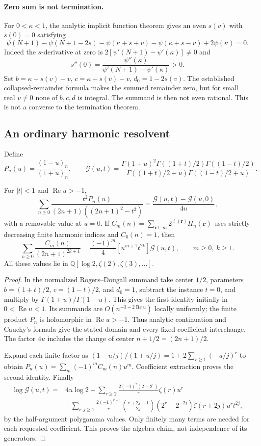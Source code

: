 \paragraph{Zero sum is not termination.}
For $0<\kappa<1$, the analytic implicit function theorem gives an even
$s(v)$ with $s(0)=0$ satisfying
\[
 \psi(N+1)-\psi(N+1-2s)-\psi(\kappa+s+v)
        -\psi(\kappa+s-v)+2\psi(\kappa)=0.
\]
Indeed the $s$-derivative at zero is
$2[\psi'(N+1)-\psi'(\kappa)]\ne0$ and
\[
 s''(0)=\frac{\psi''(\kappa)}{\psi'(N+1)-\psi'(\kappa)}>0.
\]
Set $b=\kappa+s(v)+v$, $c=\kappa+s(v)-v$, $d_0=1-2s(v)$.
The established collapsed-remainder formula makes the summed remainder
zero, but for small real $v\ne0$ none of $b,c,d$ is integral.
The summand is then not even rational. This is not a converse to the
termination theorem.

\subsection{An ordinary harmonic resolvent}
Define
\[
 P_n(u)=\frac{(1-u)_n}{(1+u)_n},\qquad
 \mathcal G(u,t)=\frac{\Gamma(1+u)^2\Gamma((1+t)/2)\Gamma((1-t)/2)}
 {\Gamma((1+t)/2+u)\Gamma((1-t)/2+u)}.
\]
\begin{theorem}
\label{dterm:thm:generator}
For $|t|<1$ and $\operatorname{Re}u>-1$,
\[
 \sum_{n\ge0}\frac{t^2P_n(u)}{(2n+1)((2n+1)^2-t^2)}
       =\frac{\mathcal G(u,t)-\mathcal G(u,0)}{4u},
\]
with a removable value at $u=0$. If
$C_m(n)=\sum_{\mathbf r\vDash m}2^{\ell(\mathbf r)}H_n(\mathbf r)$
uses strictly decreasing finite harmonic indices and $C_0(n)=1$, then
\[
 \sum_{n\ge0}\frac{C_m(n)}{(2n+1)^{2k+1}}
 =\frac{(-1)^m}{4}[u^{m+1}t^{2k}]\mathcal G(u,t),\qquad m\ge0,\ k\ge1.
\]
All these values lie in $\mathbb Q[\log2,\zeta(2),\zeta(3),\ldots]$.
\end{theorem}
\begin{proof}
In the normalized Rogers--Dougall summand take center $1/2$, parameters
$b=(1+t)/2$, $c=(1-t)/2$, and $d_0=1$, subtract the instance $t=0$,
and multiply by $\Gamma(1+u)/\Gamma(1-u)$. This gives the first
identity initially in $0<\operatorname{Re}u<1$. Its summands are
$O(n^{-3-2\operatorname{Re}u})$ locally uniformly; the finite product
$P_n$ is holomorphic in $\operatorname{Re}u>-1$. Thus analytic
continuation and Cauchy's formula give the stated domain and every
fixed coefficient interchange. The factor $4u$ includes the change
of center $n+1/2=(2n+1)/2$.

Expand each finite factor as
$(1-u/j)/(1+u/j)=1+2\sum_{r\ge1}(-u/j)^r$ to obtain
$P_n(u)=\sum_m(-1)^mC_m(n)u^m$. Coefficient extraction proves the
second identity. Finally
\begin{align*}
 \log\mathcal G(u,t)={}&4u\log2+
  \sum_{r\ge2}\frac{2(-1)^r(2-2^r)}r\zeta(r)u^r\\
 &+\sum_{r,j\ge1}\frac{2(-1)^{r+1}}r\binom{r+2j-1}{2j}
             (2^r-2^{-2j})\zeta(r+2j)u^rt^{2j},
\end{align*}
by the half-argument polygamma values. Only finitely many terms are
needed for each requested coefficient. This proves the algebra claim,
not independence of its generators.
\end{proof}

